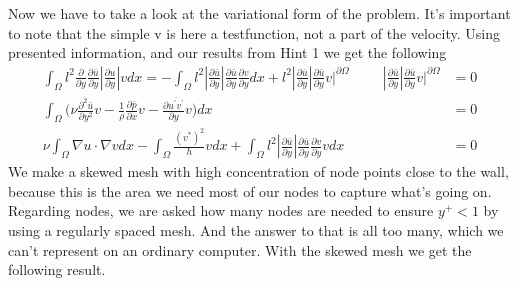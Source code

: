 \documentclass[a4paper,norsk]{article}
\begin{document}
Now we have to take a look at the variational form of the problem. It's important to note that the simple v is here a testfunction, not a part of the velocity. Using presented information, and our results from Hint 1 we get the following
\begin{align*}
\int_\Omega l^2\frac{\partial}{\partial y} \frac{\partial \bar{u}}{\partial y} |\frac{\partial u}{\partial y}| v dx 
= -\int_\Omega l^2|\frac{\partial \bar{u}}{\partial y}| \frac{\partial \bar{u}}{\partial y} \frac{\partial v}{\partial y} dx + l^2|\frac{\partial \bar{u}}{\partial y}| \frac{\partial \bar{u}}{\partial y} v \Big|^{\partial \Omega} 
\hspace{1cm} |\frac{\partial \bar{u}}{\partial y}| \frac{\partial \bar{u}}{\partial y} v \Big|^{\partial \Omega} &= 0 \\
\int_\Omega \Big(\nu \frac{\partial^2 \bar{u}}{\partial y^2}v - \frac{1}{\rho} \frac{\partial \bar{p}}{\partial x}v -
\frac{\partial \overline{u^\prime v^\prime}}{\partial y}v  \Big)dx &= 0 \\
\nu\int_\Omega \nabla u \cdot \nabla v dx - \int_\Omega \frac{(v^*)^2}{h} v dx
+ \int_\Omega l^2|\frac{\partial \bar{u}}{\partial y}| \frac{\partial \bar{u}}{\partial y} \frac{\partial v}{\partial y} vdx &= 0
\end{align*}
We make a skewed mesh with high concentration of node points close to the wall, because this is the area we need 
most of our nodes to capture what's going on. Regarding nodes, we are asked how many nodes are needed to ensure 
$y^+ < 1$ by using a regularly spaced mesh. And the answer to that is all too many, which we can't represent on an ordinary computer. With the skewed mesh we get the following result.
\newpage
\end{document}
